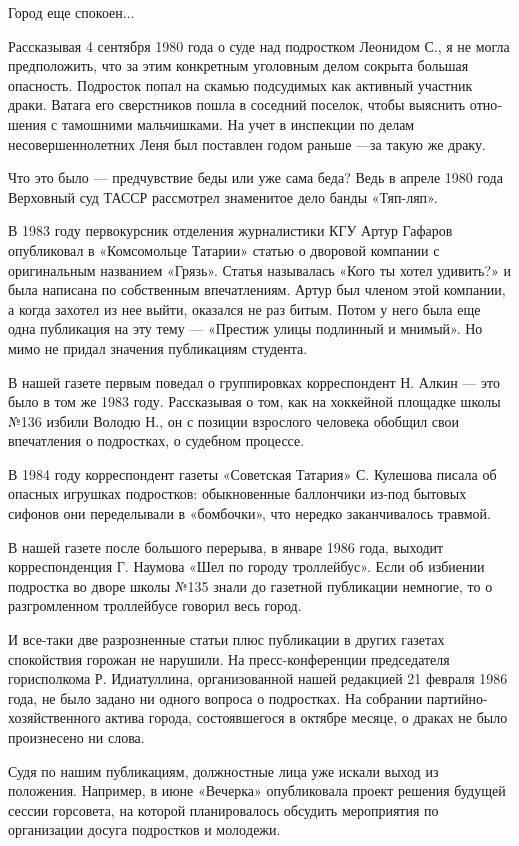 \documentclass[12pt, a4paper, openany]{book}
\begin{document}
Город еще спокоен...

Рассказывая 4 сентября 1980 года о суде над под­ростком Леонидом С., я не могла предположить, что за этим конкретным уголовным делом сокрыта боль­шая опасность. Подросток попал на скамью подсуди­мых как активный участник драки. Ватага его сверст­ников пошла в соседний поселок, чтобы выяснить отно­шения с тамошними мальчишками. На учет в инспекции по делам несовершеннолетних Леня был поставлен го­дом раньше —за такую же драку.

Что это было — предчувствие беды или уже сама беда? Ведь в апреле 1980 года Верховный суд ТАССР рассмотрел знаменитое дело банды «Тяп-ляп».

В 1983 году первокурсник отделения журналисти­ки КГУ Артур Гафаров опубликовал в «Комсомольце Татарии» статью о дворовой компании с оригинальным названием «Грязь». Статья называлась «Кого ты хотел удивить?» и была написана по собственным впечатлениям. Артур был членом этой компании, а когда захотел из нее выйти, оказался не раз битым. Потом у него была еще одна публикация на эту тему — «Престиж улицы подлинный и мнимый». Но мимо не придал значения публикациям студента.

В нашей газете первым поведал о группировках корреспондент Н. Алкин — это было в том же 1983 году. Рассказывая о том, как на хоккейной площадке школы №136 избили Володю Н., он с позиции взрослого человека обобщил свои впечатления о подростках, о судебном процессе.

В 1984 году корреспондент газеты «Советская Татария» С. Кулешова писала об опасных игрушках подростков: обыкновенные баллончики из-под бытовых сифонов они переделывали в «бомбочки», что нередко заканчивалось травмой.

В нашей газете после большого перерыва, в январе 1986 года, выходит  корреспонденция Г. Наумова «Шел по городу троллейбус». Если об избиении подростка во дворе школы №135 знали до газетной публикации немногие, то о разгромленном троллейбусе говорил весь город.

И все-таки две разрозненные статьи плюс публи­кации в других газетах спокойствия горожан не нару­шили. На пресс-конференции председателя горисполкома Р. Идиатуллина, организованной нашей редакцией 21 февраля 1986 года, не  было задано ни одного вопроса о подростках. На собрании партийно-хозяйствен­ного актива города, состоявшегося в октябре месяце, о драках не было произнесено ни слова.

Судя по нашим публикациям, должностные лица уже искали выход из положения. Например, в июне «Вечерка» опубликовала проект решения будущей сессии  горсовета, на которой планировалось обсудить ме­роприятия по организации досуга подростков и моло­дежи.
\end{document}
